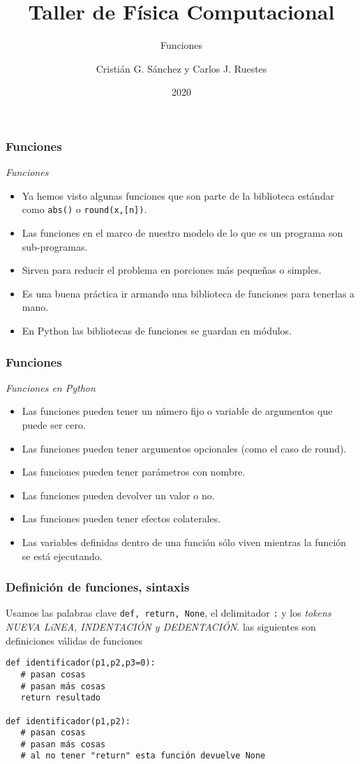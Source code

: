 \documentclass{beamer}
\title{Taller de Física Computacional}
\subtitle{Funciones}
\author{Cristián G. Sánchez y Carlos J. Ruestes}
\date{2020}
\begin{document}
\frame{\titlepage}

\begin{frame}[fragile]
\frametitle{Funciones}
\begin{block}{{\em Funciones}}
\begin{itemize}
\item Ya hemos visto algunas funciones que son parte de la biblioteca estándar como  \texttt{abs()} o \texttt{round(x,[n])}.
\item Las funciones en el marco de nuestro modelo de lo que es un programa son sub-programas.
\item Sirven para reducir el problema en porciones más pequeñas o simples.
\item Es una buena práctica ir armando una biblioteca de funciones para tenerlas a mano.
\item En Python las bibliotecas de funciones se guardan en \alert{módulos}.
\end{itemize}
\end{block}
\end{frame}

\begin{frame}[fragile]
\frametitle{Funciones}
\begin{block}{{\em Funciones en Python}}
\begin{itemize}
\item Las funciones pueden tener un número fijo o variable de argumentos que puede ser cero.
\item Las funciones pueden tener argumentos opcionales (como el caso de round).
\item Las funciones pueden tener parámetros con nombre.
\item Las funciones pueden devolver un valor o no.
\item Las funciones pueden tener \alert{efectos colaterales}.
\item Las variables definidas dentro de una función sólo viven mientras la función se está ejecutando.
\end{itemize}
\end{block}
\end{frame}

\begin{frame}[fragile]
\frametitle{Definición de funciones, sintaxis}
Usamos las palabras clave \texttt{def, return, None}, el delimitador \texttt{:} y los {\em tokens NUEVA LíNEA, INDENTACIÓN y DEDENTACIÓN}. las siguientes son definiciones válidas de funciones
\begin{block}{}
\begin{verbatim}
def identificador(p1,p2,p3=0):
   # pasan cosas
   # pasan más cosas
   return resultado 
 
def identificador(p1,p2):
   # pasan cosas
   # pasan más cosas
   # al no tener "return" esta función devuelve None
   
\end{verbatim}
\end{block}
\end{frame}
\end{document}
